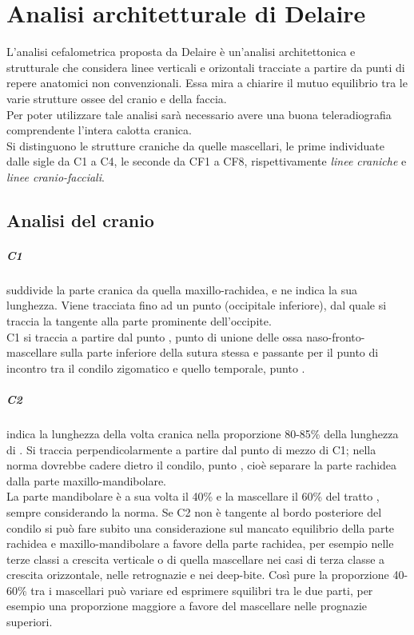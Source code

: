 \chapter{Analisi architetturale di Delaire}
\nocite{Delaire1981,Cudia1991}

L'analisi cefalometrica proposta da Delaire è un'analisi architettonica e strutturale che considera linee verticali e orizontali tracciate a partire da punti di repere anatomici non convenzionali. Essa mira a chiarire il mutuo equilibrio tra le varie strutture ossee del cranio e della faccia.\\
Per poter utilizzare tale analisi sarà necessario avere una buona teleradiografia comprendente l'intera calotta cranica.\\

Si distinguono le strutture craniche da quelle mascellari, le prime individuate dalle sigle da C1 a C4, le seconde da CF1 a CF8, rispettivamente \emph{linee craniche} e \emph{linee cranio-facciali}.\\

\section{Analisi del cranio}
\paragraph{C1} suddivide la parte cranica da quella maxillo-rachidea, e ne indica la sua lunghezza. Viene tracciata fino ad un punto  (occipitale inferiore), dal quale si traccia la tangente alla parte prominente dell'occipite.\\
C1 si traccia a partire dal punto , punto di unione delle ossa naso-fronto-mascellare sulla parte inferiore della sutura stessa e passante per il punto di incontro tra il condilo zigomatico e quello temporale, punto .

\paragraph{C2} indica la lunghezza della volta cranica nella proporzione 80-85\% della lunghezza di . Si traccia perpendicolarmente a partire dal punto di mezzo di C1; nella norma dovrebbe cadere dietro il condilo, punto , cioè separare la parte rachidea dalla parte maxillo-mandibolare.\\
La parte mandibolare è a sua volta il 40\% e la mascellare il 60\% del tratto , sempre considerando la norma. Se C2 non è tangente al bordo posteriore del condilo si può fare subito una considerazione sul mancato equilibrio della parte rachidea e maxillo-mandibolare a favore della parte rachidea, per esempio nelle terze classi a crescita verticale o di quella mascellare nei casi di terza classe a crescita orizzontale, nelle retrognazie e nei deep-bite. Così pure la proporzione 40-60\% tra i mascellari può variare ed esprimere squilibri tra le due parti, per esempio una proporzione maggiore a favore del mascellare nelle prognazie superiori.

